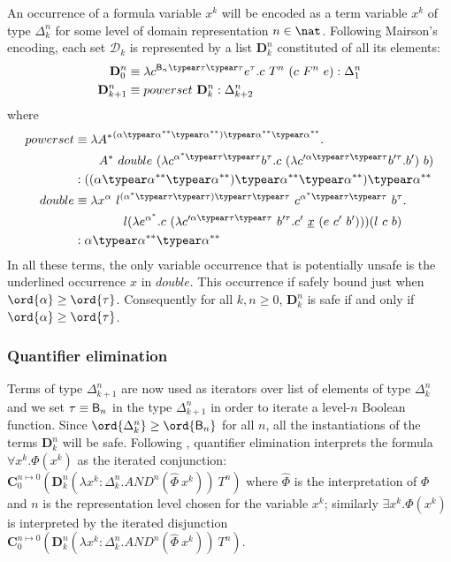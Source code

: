 An occurrence of a formula variable $x^k$ will be encoded as a term variable $x^k$ of type $\Delta_{k}^n$ for some level of domain representation $n\in\nat$.
Following Mairson's  encoding, each set $\mathcal{D}_k$ is represented by a list $\mathbf{D}_k^n$ constituted of all its elements:
\begin{align*}
\mathbf{D}_0^n &\equiv \lambda c^{\booltype_n \typear \tau \typear \tau} e^\tau . c~T^n~(c~F^n~e) : \Delta_1^n \\
\mathbf{D}_{k+1}^n &\equiv powerset~\mathbf{D}_k^n : \Delta_{k+2}^n
\end{align*}
where
\begin{align*}
  powerset &\equiv \lambda {A^*}^{(\alpha \typear \alpha^{**} \typear \alpha^{**}) \typear \alpha^{**} \typear \alpha^{**}}. \\
&\qquad  A^*~double~(\lambda c^{\alpha^* \typear \tau\typear \tau} b^\tau . c~(\lambda c'^{\alpha\typear \tau\typear \tau} b'^\tau.b')~b)\\
 &: ((\alpha \typear \alpha^{**} \typear \alpha^{**}) \typear \alpha^{**} \typear \alpha^{**})\typear \alpha^{**} \\
  double &\equiv \lambda x^\alpha~l^{(\alpha^* \typear \tau\typear \tau)\typear \tau\typear \tau}~ c^{\alpha^*\typear \tau\typear \tau}~b^\tau. \\
  & \qquad \qquad l(\lambda e^{\alpha^*}.c~(\lambda c'^{\alpha\typear \tau\typear \tau}~ b'^\tau.c'~\underline{x}~(e~c'~b')))(l~c~b)\\
 &: \alpha \typear \alpha^{**} \typear \alpha^{**}
\end{align*}
In all these terms, the only variable occurrence that is potentially unsafe is the underlined occurrence $x$ in $double$. This occurrence if safely bound just when $\ord{\alpha} \geq \ord{\tau}$.
Consequently for all $k,n\geq0$, $\mathbf{D}_k^n$ is safe if and only if $\ord{\alpha} \geq \ord{\tau}$.


\subsubsection{Quantifier elimination}
Terms of type $\Delta_{k+1}^n$ are now used as iterators over list of elements of type $\Delta_k^n$ and we set $\tau \equiv \mathsf{B}_n$ in the type $\Delta_{k+1}^n$ in order to iterate a level-$n$ Boolean function. Since $\ord{\Delta_k^n} \geq \ord{\booltype_n}$ for all $n$, all the instantiations of the terms $\mathbf{D}_k^n$ will be safe. Following \cite{mairson1992spt}, quantifier elimination interprets the formula $\forall x^k.\Phi(x^k)$ as the iterated conjunction:
$\mathbf{C}_0^{n\mapsto 0} \left( \mathbf{D}_k^n(\lambda x^k:\Delta_k^n.AND^n(\hat\Phi~x^k))~T^n \right)$ where $\hat\Phi$ is the interpretation of $\Phi$
and $n$ is the representation level chosen for the variable $x^k$; similarly $\exists x^k.\Phi(x^k)$  is interpreted by the iterated disjunction $\mathbf{C}_0^{n\mapsto 0} \left( \mathbf{D}_k^n(\lambda x^k:\Delta_k^n.AND^n(\hat\Phi~x^k))~T^n\right)$.

